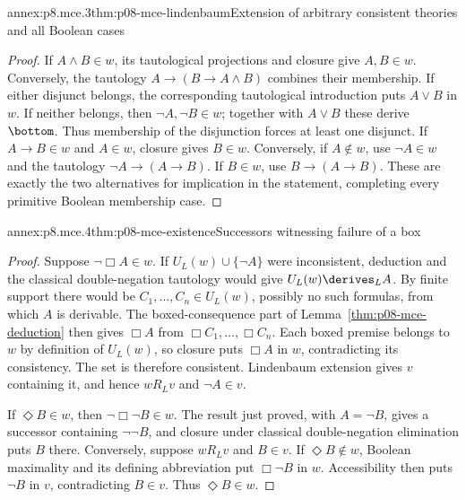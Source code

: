 \begin{annexitem}{annex:p8.mce.3}{thm:p08-mce-lindenbaum}{Extension of arbitrary consistent theories and all Boolean cases}
\begin{proof}
If \(A\land B\in w\), its tautological projections and closure give
\(A,B\in w\). Conversely, the tautology
\(A\to(B\to A\land B)\) combines their membership.
If either disjunct belongs, the corresponding tautological introduction
puts \(A\lor B\) in \(w\). If neither belongs, then
\(\neg A,\neg B\in w\); together with \(A\lor B\) these derive
\(\bottom\). Thus membership of the disjunction forces at least one
disjunct. If \(A\to B\in w\) and \(A\in w\), closure gives
\(B\in w\). Conversely, if \(A\notin w\), use
\(\neg A\in w\) and the tautology \(\neg A\to(A\to B)\).
If \(B\in w\), use \(B\to(A\to B)\). These are exactly the
two alternatives for implication in the statement, completing every
primitive Boolean membership case.
\end{proof}
\end{annexitem}

\begin{annexitem}{annex:p8.mce.4}{thm:p08-mce-existence}{Successors witnessing failure of a box}
\begin{proof}
Suppose \(\neg\Box A\in w\). If
\(U_L(w)\cup\{\neg A\}\) were inconsistent, deduction and the
classical double-negation tautology would give
\(U_L(w)\derives_L A\). By finite support there would be
\(C_1,\ldots,C_n\in U_L(w)\), possibly no such formulas, from
which \(A\) is derivable. The boxed-consequence part of
Lemma~\ref{thm:p08-mce-deduction} then gives \(\Box A\) from
\(\Box C_1,\ldots,\Box C_n\). Each boxed premise belongs to
\(w\) by definition of \(U_L(w)\), so closure puts \(\Box A\)
in \(w\), contradicting its consistency. The set is therefore
consistent. Lindenbaum extension gives \(v\) containing it, and hence
\(wR_Lv\) and \(\neg A\in v\).

If \(\Diamond B\in w\), then \(\neg\Box\neg B\in w\).
The result just proved, with \(A=\neg B\), gives a successor containing
\(\neg\neg B\), and closure under classical double-negation
elimination puts \(B\) there. Conversely, suppose \(wR_Lv\) and
\(B\in v\). If \(\Diamond B\notin w\), Boolean maximality and
its defining abbreviation put \(\Box\neg B\) in \(w\).
Accessibility then puts \(\neg B\) in \(v\), contradicting
\(B\in v\). Thus \(\Diamond B\in w\).
\end{proof}
\end{annexitem}

